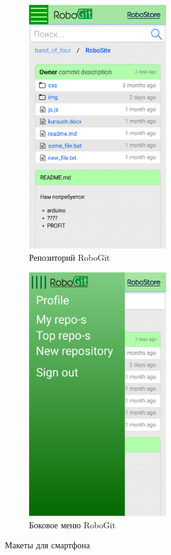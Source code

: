 \documentclass[12pt, a4paper]{article}
\begin{document}
\begin{figure}
  \centering
  \begin{subfigure}[b]{0.47\textwidth}
    \includegraphics[width=6cm]{png/git_repo_smart.png}
    \caption{Репозиторий RoboGit}
  \end{subfigure}
  \begin{subfigure}[b]{0.47\textwidth}
    \includegraphics[width=6cm]{png/git_menu_smart.png}
    \caption{Боковое меню RoboGit}
  \end{subfigure}
  \caption{Макеты для смартфона }
\end{figure}
\end{document}
